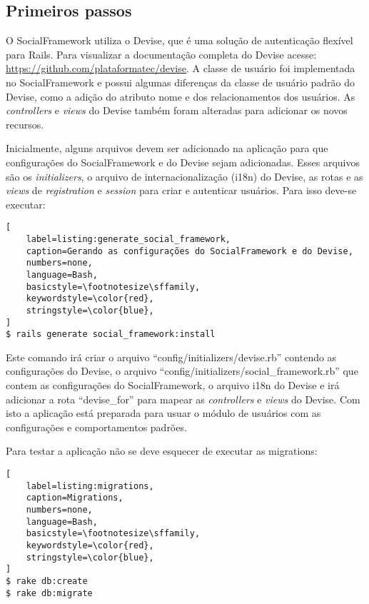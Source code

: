 \subsection{Primeiros passos}

O SocialFramework utiliza o Devise, que é uma solução de autenticação flexível para Rails. Para visualizar a documentação completa do Devise acesse: \url{https://github.com/plataformatec/devise}. A classe de usuário foi implementada no SocialFramework e possui algumas diferenças da classe de usuário padrão do Devise, como a adição do atributo nome e dos relacionamentos dos usuários. As \textit{controllers} e \textit{views} do Devise também foram alteradas para adicionar os novos recursos.

Inicialmente, alguns arquivos devem ser adicionado na aplicação para que configurações do SocialFramework e do Devise sejam adicionadas. Esses arquivos são os \textit{initializers}, o arquivo de internacionalização (i18n) do Devise, as rotas e as \textit{views} de \textit{registration} e \textit{session} para criar e autenticar usuários. Para isso deve-se executar:

\begin{lstlisting}[
    label=listing:generate_social_framework,
    caption=Gerando as configurações do SocialFramework e do Devise,
    numbers=none,
    language=Bash,
    basicstyle=\footnotesize\sffamily,
    keywordstyle=\color{red},
    stringstyle=\color{blue},
]
$ rails generate social_framework:install
\end{lstlisting}

Este comando irá criar o arquivo ``config/initializers/devise.rb'' contendo as configurações do Devise, o arquivo ``config/initializers/social\_framework.rb'' que contem as configurações do SocialFramework, o arquivo i18n do Devise e irá adicionar a rota ``devise\_for'' para mapear as \textit{controllers} e \textit{views} do Devise. Com isto a aplicação está preparada para usuar o módulo de usuários com as configurações e comportamentos padrões.

Para testar a aplicação não se deve esquecer de executar as migrations:

\begin{lstlisting}[
    label=listing:migrations,
    caption=Migrations,
    numbers=none,
    language=Bash,
    basicstyle=\footnotesize\sffamily,
    keywordstyle=\color{red},
    stringstyle=\color{blue},
]
$ rake db:create
$ rake db:migrate
\end{lstlisting}

